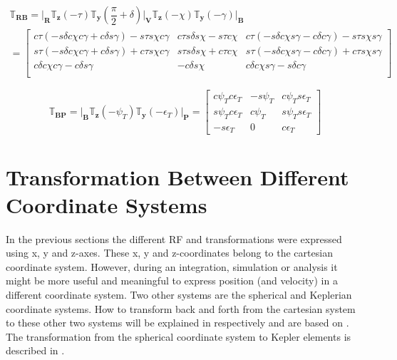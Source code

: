 \begin{multline} \label{eq:RBtrans}
\mathbb{T}_{\mathbf{RB}}=\Bigg|_{\mathbf{R}}\mathbb{T}_{\mathbf{z}}\left(-\tau\right)\mathbb{T}_{\mathbf{y}}\left(\dfrac{\pi}{2}+\delta\right)\Bigg|_{\mathbf{V}}\mathbb{T}_{\mathbf{z}}\left(-\chi\right)\mathbb{T}_{\mathbf{y}}\left(-\gamma\right)\Bigg|_{\mathbf{B}}\\
=
\begin{bmatrix}
c\tau\left(-s\delta c\chi c\gamma +c\delta s\gamma \right)-s\tau s\chi c\gamma  & c\tau s\delta s\chi -s\tau c\chi & c\tau\left(-s\delta c\chi s\gamma -c\delta c\gamma \right)-s\tau s\chi s\gamma \\
s\tau\left(-s\delta c\chi c\gamma +c\delta s\gamma \right)+c\tau s\chi c\gamma  & s\tau s\delta s\chi +c\tau c\chi & s\tau\left(-s\delta c\chi s\gamma -c\delta c\gamma \right)+c\tau s\chi s\gamma \\
c\delta c\chi c\gamma -c\delta s\gamma  & -c\delta s\chi &  c\delta c\chi s\gamma -s\delta c\gamma \\
\end{bmatrix}
\end{multline}



\begin{equation} \label{eq:BPtrans}
\mathbb{T}_{\mathbf{BP}}=\Bigg|_{\mathbf{B}}\mathbb{T}_{\mathbf{z}}\left(-\psi_{T}\right)\mathbb{T}_{\mathbf{y}}\left(-\epsilon_{T}\right)\Bigg|_{\mathbf{P}}=
\begin{bmatrix}
c\psi_{T}c\epsilon_{T} & -s\psi_{T} & c\psi_{T}s\epsilon_{T}\\
s\psi_{T}c\epsilon_{T} & c\psi_{T} & s\psi_{T}s\epsilon_{T}\\
-s\epsilon_{T} & 0 & c\epsilon_{T}
\end{bmatrix}
\end{equation}



\section{Transformation Between Different Coordinate Systems}
\label{sec:transsys}
In the previous sections the different \ac{RF} and transformations were expressed using x, y and z-axes. These x, y and z-coordinates belong to the cartesian coordinate system. However, during an integration, simulation or analysis it might be more useful and meaningful to express position (and velocity) in a different coordinate system. Two other systems are the spherical and Keplerian coordinate systems. How to transform back and forth from the cartesian system to these other two systems will be explained in  respectively and are based on \cite{noomen2013basic}. The transformation from the spherical coordinate system to Kepler elements is described in . 

